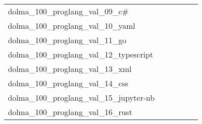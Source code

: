 {\begin{longtable}{m{6cm}m{1.7cm}m{1.7cm}m{1.7cm}m{1.7cm}m{1.7cm}}
	dolma\_100\_proglang\_val\_09\_c\#  & \colorbox[HTML]{e7f5ad}{\makebox[\mywidth][c]{2.23}} & \colorbox[HTML]{fbfdd1}{\makebox[\mywidth][c]{2.28}} & \colorbox[HTML]{ffffe5}{\makebox[\mywidth][c]{2.45}} & \colorbox[HTML]{77c578}{\makebox[\mywidth][c]{2.19}} & \colorbox[HTML]{eff8b3}{\makebox[\mywidth][c]{2.24}}\\
	dolma\_100\_proglang\_val\_10\_yaml  & \colorbox[HTML]{86cc7e}{\makebox[\mywidth][c]{2.93}} & \colorbox[HTML]{d1ec9f}{\makebox[\mywidth][c]{3.01}} & \colorbox[HTML]{ffffe5}{\makebox[\mywidth][c]{3.71}} & \colorbox[HTML]{96d385}{\makebox[\mywidth][c]{2.94}} & \colorbox[HTML]{77c578}{\makebox[\mywidth][c]{2.92}}\\
	dolma\_100\_proglang\_val\_11\_go  & \colorbox[HTML]{77c578}{\makebox[\mywidth][c]{1.75}} & \colorbox[HTML]{e4f4ab}{\makebox[\mywidth][c]{1.78}} & \colorbox[HTML]{ffffe5}{\makebox[\mywidth][c]{1.97}} & \colorbox[HTML]{bee496}{\makebox[\mywidth][c]{1.77}} & \colorbox[HTML]{81c97c}{\makebox[\mywidth][c]{1.75}}\\
	dolma\_100\_proglang\_val\_12\_typescript  & \colorbox[HTML]{a5d98b}{\makebox[\mywidth][c]{2.17}} & \colorbox[HTML]{e3f4aa}{\makebox[\mywidth][c]{2.20}} & \colorbox[HTML]{ffffe5}{\makebox[\mywidth][c]{2.41}} & \colorbox[HTML]{b4e091}{\makebox[\mywidth][c]{2.18}} & \colorbox[HTML]{77c578}{\makebox[\mywidth][c]{2.16}}\\
	dolma\_100\_proglang\_val\_13\_xml  & \colorbox[HTML]{77c578}{\makebox[\mywidth][c]{2.44}} & \colorbox[HTML]{e7f5ad}{\makebox[\mywidth][c]{2.50}} & \colorbox[HTML]{ffffe5}{\makebox[\mywidth][c]{2.78}} & \colorbox[HTML]{98d485}{\makebox[\mywidth][c]{2.46}} & \colorbox[HTML]{c8e89a}{\makebox[\mywidth][c]{2.48}}\\
	dolma\_100\_proglang\_val\_14\_css  & \colorbox[HTML]{fafdce}{\makebox[\mywidth][c]{2.25}} & \colorbox[HTML]{fafdca}{\makebox[\mywidth][c]{2.25}} & \colorbox[HTML]{ffffe5}{\makebox[\mywidth][c]{2.34}} & \colorbox[HTML]{a5d98b}{\makebox[\mywidth][c]{2.21}} & \colorbox[HTML]{77c578}{\makebox[\mywidth][c]{2.20}}\\
	dolma\_100\_proglang\_val\_15\_jupyter-nb  & \colorbox[HTML]{77c578}{\makebox[\mywidth][c]{1.57}} & \colorbox[HTML]{e1f3a9}{\makebox[\mywidth][c]{1.60}} & \colorbox[HTML]{ffffe5}{\makebox[\mywidth][c]{1.75}} & \colorbox[HTML]{b7e193}{\makebox[\mywidth][c]{1.58}} & \colorbox[HTML]{aadc8d}{\makebox[\mywidth][c]{1.58}}\\
	dolma\_100\_proglang\_val\_16\_rust  & \colorbox[HTML]{77c578}{\makebox[\mywidth][c]{1.96}} & \colorbox[HTML]{ecf7b1}{\makebox[\mywidth][c]{2.01}} & \colorbox[HTML]{ffffe5}{\makebox[\mywidth][c]{2.23}} & \colorbox[HTML]{98d485}{\makebox[\mywidth][c]{1.97}} & \colorbox[HTML]{89cd7f}{\makebox[\mywidth][c]{1.96}}\\

\end{longtable}}
